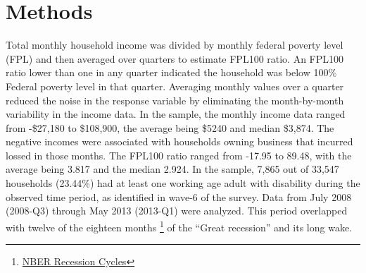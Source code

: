 \documentclass[11pt]{extarticle} %
\begin{document}
\section{Methods}
Total monthly household income was divided by monthly federal poverty level (FPL) and then averaged over quarters to estimate FPL100 ratio. An FPL100 ratio lower than one in any quarter indicated the household was below 100\% Federal poverty level in that quarter. Averaging monthly values over a quarter reduced the noise in the response variable by eliminating the month-by-month variability in the income data. In the sample, the monthly income data ranged from -\$27,180 to \$108,900, the average being \$5240 and median \$3,874. The negative incomes were associated with households owning business that incurred lossed in those months. The FPL100 ratio ranged from -17.95 to 89.48, with the average being 3.817 and the median 2.924. In the sample, 7,865 out of 33,547 households (23.44\%) had at least one working age adult with disability during the observed time period, as identified in wave-6 of the survey. Data from July 2008 (2008-Q3) through May 2013 (2013-Q1) were analyzed. This period overlapped with twelve of the eighteen months {\footnote{\href{http://www.nber.org/cycles/}{NBER Recession Cycles}}} of the ``Great recession'' and its long wake. 
\end{document}
